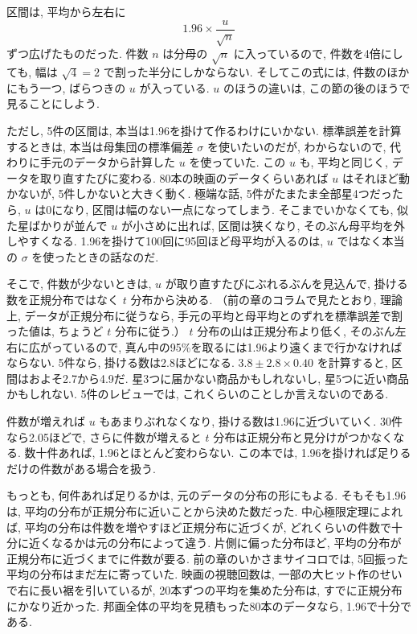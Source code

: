     区間は, 平均から左右に
    \[
      1.96 \times \frac{u}{\sqrt{n}}
    \]
    ずつ広げたものだった.
    件数 $n$ は分母の $\sqrt{n}$ に入っているので, 件数を4倍にしても, 幅は $\sqrt{4} = 2$ で割った半分にしかならない.
    そしてこの式には, 件数のほかにもう一つ, ばらつきの $u$ が入っている.
    $u$ のほうの違いは, この節の後のほうで見ることにしよう.

    ただし, 5件の区間は, 本当は1.96を掛けて作るわけにいかない.
    標準誤差を計算するときは, 本当は母集団の標準偏差 $\sigma$ を使いたいのだが, わからないので, 代わりに手元のデータから計算した $u$ を使っていた.
    この $u$ も, 平均と同じく, データを取り直すたびに変わる.
    80本の映画のデータくらいあれば $u$ はそれほど動かないが, 5件しかないと大きく動く.
    極端な話, 5件がたまたま全部星4つだったら, $u$ は0になり, 区間は幅のない一点になってしまう.
    そこまでいかなくても, 似た星ばかりが並んで $u$ が小さめに出れば, 区間は狭くなり, そのぶん母平均を外しやすくなる.
    1.96を掛けて100回に95回ほど母平均が入るのは, $u$ ではなく本当の $\sigma$ を使ったときの話なのだ.

    そこで, 件数が少ないときは, $u$ が取り直すたびにぶれるぶんを見込んで, 掛ける数を正規分布ではなく $t$ 分布から決める.
    （前の章のコラムで見たとおり, 理論上, データが正規分布に従うなら, 手元の平均と母平均とのずれを標準誤差で割った値は, ちょうど $t$ 分布に従う.）
    $t$ 分布の山は正規分布より低く, そのぶん左右に広がっているので, 真ん中の95\%を取るには1.96より遠くまで行かなければならない.
    5件なら, 掛ける数は2.8ほどになる.
    $3.8 \pm 2.8 \times 0.40$ を計算すると, 区間はおよそ2.7から4.9だ.
    星3つに届かない商品かもしれないし, 星5つに近い商品かもしれない.
    5件のレビューでは, これくらいのことしか言えないのである.

    件数が増えれば $u$ もあまりぶれなくなり, 掛ける数は1.96に近づいていく.
    30件なら2.05ほどで, さらに件数が増えると $t$ 分布は正規分布と見分けがつかなくなる.
    数十件あれば, 1.96とほとんど変わらない.
    この本では, 1.96を掛ければ足りるだけの件数がある場合を扱う.

    もっとも, 何件あれば足りるかは, 元のデータの分布の形にもよる.
    そもそも1.96は, 平均の分布が正規分布に近いことから決めた数だった.
    中心極限定理によれば, 平均の分布は件数を増やすほど正規分布に近づくが, どれくらいの件数で十分に近くなるかは元の分布によって違う.
    片側に偏った分布ほど, 平均の分布が正規分布に近づくまでに件数が要る.
    前の章のいかさまサイコロでは, 5回振った平均の分布はまだ左に寄っていた.
    映画の視聴回数は, 一部の大ヒット作のせいで右に長い裾を引いているが, 20本ずつの平均を集めた分布は, すでに正規分布にかなり近かった.
    邦画全体の平均を見積もった80本のデータなら, 1.96で十分である.

